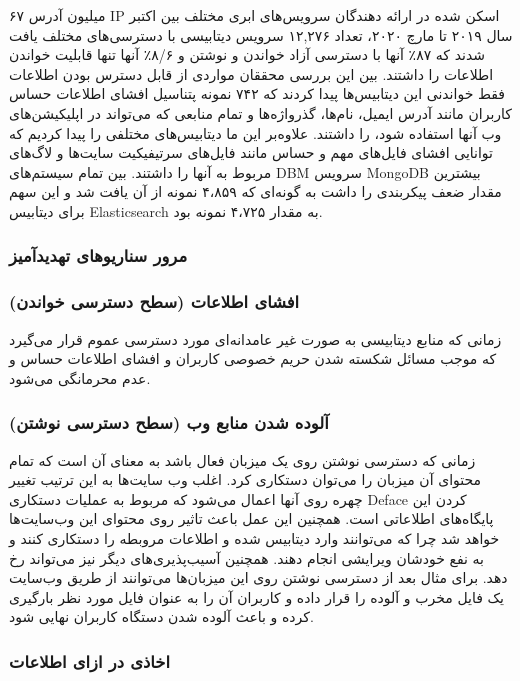 \documentclass[10pt, a4paper]{article}
\begin{document}
۶۷ میلیون آدرس IP اسکن شده در ارائه دهندگان سرویس‌های ابری مختلف بین اکتبر سال
۲۰۱۹ تا مارچ ۲۰۲۰، تعداد ۱۲,۲۷۶ سرویس دیتابیسی با دسترسی‌های مختلف یافت شدند که
۸۷٪ آنها با دسترسی آزاد خواندن و نوشتن و ۸/۶٪ آنها تنها قابلیت خواندن اطلاعات را
داشتند. بین این بررسی محققان مواردی از قابل دسترس بودن اطلاعات فقط خواندنی این
دیتابیس‌ها پیدا کردند که ۷۴۲ نمونه پتناسیل افشای اطلاعات حساس کاربران مانند آدرس
ایمیل، نام‌ها، گذرواژه‌ها و تمام منابعی که می‌تواند در اپلیکیشن‌های وب آنها
استفاده شود، را داشتند. علاوه‌بر این ما دیتابیس‌های مختلفی را پیدا کردیم که
توانایی افشای فایل‌های مهم و حساس مانند فایل‌های سرتیفیکیت سایت‌ها و لاگ‌های
مربوط به آنها را داشتند. بین تمام سیستم‌های DBM سرویس MongoDB بیشترین مقدار ضعف
پیکربندی را داشت به گونه‌ای که ۴،۸۵۹ نمونه از آن یافت شد و این سهم برای دیتابیس‌
Elasticsearch به مقدار ۴،۷۲۵ نمونه بود.

\subsubsection{مرور سناریو‌های تهدیدآمیز}

\subsubsection*{افشای اطلاعات (سطح دسترسی خواندن)}

زمانی که منابع دیتابیسی به صورت غیر عامدانه‌ای مورد دسترسی عموم قرار می‌گیرد که
موجب مسائل شکسته شدن حریم خصوصی کاربران و افشای اطلاعات حساس و عدم محرمانگی
می‌شود.

\subsubsection*{آلوده شدن منابع وب (سطح دسترسی نوشتن)}

زمانی که دسترسی نوشتن روی یک میزبان فعال باشد به معنای آن است که تمام محتوای آن
میزبان را می‌توان دستکاری کرد. اغلب وب سایت‌ها به این ترتیب تغییر چهره روی آنها
اعمال می‌شود که مربوط به عملیات دستکاری Deface کردن این پایگاه‌های اطلاعاتی است.
همچنین این عمل باعث تاثیر روی محتوای این وب‌سایت‌ها خواهد شد چرا که می‌توانند
وارد دیتابیس شده و اطلاعات مروبطه را دستکاری کنند و به نفع خودشان ویرایشی انجام
دهند. همچنین آسیب‌پذیری‌های دیگر نیز می‌تواند رخ دهد. برای مثال بعد از دسترسی
نوشتن روی این میزبان‌ها می‌توانند از طریق وب‌سایت یک فایل مخرب و آلوده را قرار
داده و کاربران آن را به عنوان فایل مورد نظر بارگیری کرده و باعث آلوده شدن دستگاه
کاربران نهایی شود.

\subsubsection{اخاذی در ازای اطلاعات}
\end{document}
